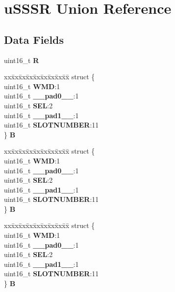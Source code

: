 \hypertarget{unionuSSSR}{}\section{u\+S\+S\+SR Union Reference}
\label{unionuSSSR}
\subsection*{Data Fields}
\begin{DoxyCompactItemize}
\item 
\mbox{\label{unionuSSSR_a456d469231776361185aa200c9917d0a}} 
uint16\+\_\+t {\bfseries R}
\item 
\mbox{\label{unionuSSSR_abfe138cd9cbee218b4d6ccf4495fa9fd}} 
\begin{tabbing}
xx\=xx\=xx\=xx\=xx\=xx\=xx\=xx\=xx\=\kill
struct \{\\
\>uint16\_t {\bfseries WMD}:1\\
\>uint16\_t {\bfseries \_\_pad0\_\_}:1\\
\>uint16\_t {\bfseries SEL}:2\\
\>uint16\_t {\bfseries \_\_pad1\_\_}:1\\
\>uint16\_t {\bfseries SLOTNUMBER}:11\\
\} {\bfseries B}\\

\end{tabbing}\item 
\mbox{\label{unionuSSSR_a77a0ab6e5391d7b455dd2f4e2553eae8}} 
\begin{tabbing}
xx\=xx\=xx\=xx\=xx\=xx\=xx\=xx\=xx\=\kill
struct \{\\
\>uint16\_t {\bfseries WMD}:1\\
\>uint16\_t {\bfseries \_\_pad0\_\_}:1\\
\>uint16\_t {\bfseries SEL}:2\\
\>uint16\_t {\bfseries \_\_pad1\_\_}:1\\
\>uint16\_t {\bfseries SLOTNUMBER}:11\\
\} {\bfseries B}\\

\end{tabbing}\item 
\mbox{\label{unionuSSSR_afde4bc423978fca42d076332c704aa9a}} 
\begin{tabbing}
xx\=xx\=xx\=xx\=xx\=xx\=xx\=xx\=xx\=\kill
struct \{\\
\>uint16\_t {\bfseries WMD}:1\\
\>uint16\_t {\bfseries \_\_pad0\_\_}:1\\
\>uint16\_t {\bfseries SEL}:2\\
\>uint16\_t {\bfseries \_\_pad1\_\_}:1\\
\>uint16\_t {\bfseries SLOTNUMBER}:11\\
\} {\bfseries B}\\


\end{tabbing}
\end{DoxyCompactItemize}
